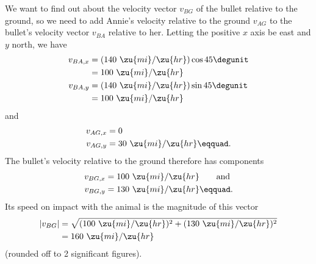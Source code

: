 We want to find out about the velocity vector $v_{BG}$ of
the bullet relative to the ground, so we need to add Annie's
velocity relative to the ground $v_{AG}$ to the bullet's
velocity vector $v_{BA}$ relative to her. Letting the
positive $x$ axis be east and $y$ north, we have
\begin{align*}
        v_{BA,x}     &=  (140\ \zu{mi}/\zu{hr}) \cos  45\degunit  \\
                     &=  100\ \zu{mi}/\zu{hr}  \\
        v_{BA,y}     &=  (140\ \zu{mi}/\zu{hr}) \sin  45\degunit  \\
                     &=  100\ \zu{mi}/\zu{hr}
\end{align*}
and
\begin{align*}
        v_{AG,x}     &=  0  \\
        v_{AG,y}     &=  30\ \zu{mi}/\zu{hr}\eqquad.
\end{align*}
The bullet's velocity relative to the ground therefore has components
\begin{align*}
        v_{BG,x}     &=  100\ \zu{mi}/\zu{hr}   \qquad \text{and}  \\
        v_{BG,y}     &=  130\ \zu{mi}/\zu{hr}\eqquad.
\end{align*}
Its speed on impact with the animal is the magnitude of this vector
\begin{align*}
        |v_{BG}|     &=  \sqrt{(100\ \zu{mi}/\zu{hr})^2+(130\ \zu{mi}/\zu{hr})^2}  \\
                 &=  160\ \zu{mi}/\zu{hr}
\end{align*}
(rounded off to 2 significant figures).
